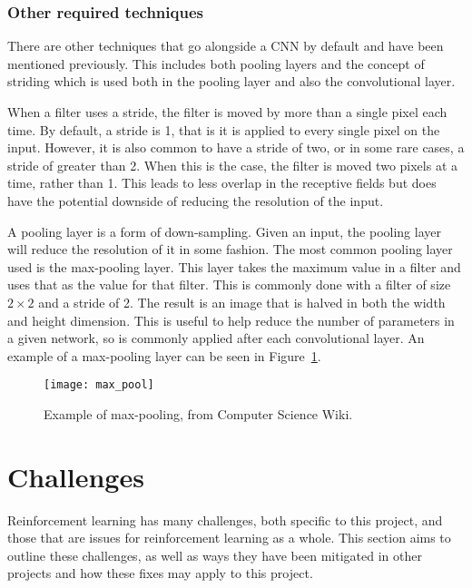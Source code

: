 \subsubsection{Other required techniques}

There are other techniques that go alongside a CNN by default and have been
mentioned previously. This includes both pooling layers and the concept of
striding which is used both in the pooling layer and also the convolutional
layer.

When a filter uses a stride, the filter is moved by more than a single pixel
each time. By default, a stride is 1, that is it is applied to every single pixel
on the input. However, it is also common to have a stride of two, or in some
rare cases, a stride of greater than 2. When this is the case, the filter
is moved two pixels at a time, rather than 1. This leads to less overlap in the
receptive fields but does have the potential downside of reducing the
resolution of the input.

A pooling layer is a form of down-sampling. Given an input, the pooling layer
will reduce the resolution of it in some fashion. The most common pooling layer
used is the max-pooling layer. This layer takes the maximum value in a filter
and uses that as the value for that filter. This is commonly done with a filter
of size $2 \times 2$ and a stride of 2. The result is an image that is halved
in both the width and height dimension. This is useful to help reduce the number
of parameters in a given network, so is commonly applied after each
convolutional layer. An example of a max-pooling layer can be seen in
Figure~\ref{fig:max_pool}.

\begin{figure}
    \centering
    \texttt{[image: max\_pool]}
    \caption{Example of max-pooling, from Computer Science Wiki\cite{max_pool}.}%
    \label{fig:max_pool}
\end{figure}

\section{Challenges}

Reinforcement learning has many challenges, both specific to this
project, and those that are issues for reinforcement learning as a whole.
This section aims to outline these challenges, as well as ways they have been
mitigated in other projects and how these fixes may apply to this project.

